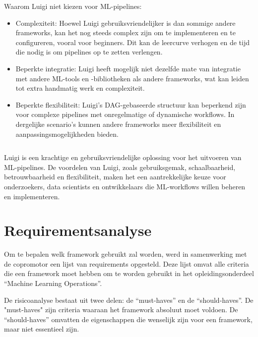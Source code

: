 Waarom Luigi niet kiezen voor ML-pipelines:
\begin{itemize}
    \item Complexiteit: Hoewel Luigi gebruiksvriendelijker is dan sommige andere frameworks, kan het nog steeds complex zijn om te implementeren en te configureren, vooral voor beginners. Dit kan de leercurve verhogen en de tijd die nodig is om pipelines op te zetten verlengen.
    \item Beperkte integratie: Luigi heeft mogelijk niet dezelfde mate van integratie met andere ML-tools en -bibliotheken als andere frameworks, wat kan leiden tot extra handmatig werk en complexiteit.
    \item Beperkte flexibiliteit: Luigi's DAG-gebaseerde structuur kan beperkend zijn voor complexe pipelines met onregelmatige of dynamische workflows. In dergelijke scenario's kunnen andere frameworks meer flexibiliteit en aanpassingsmogelijkheden bieden.
  \end{itemize}
\begin{verbatim}
\end{verbatim}
Luigi is een krachtige en gebruiksvriendelijke oplossing voor het uitvoeren van ML-pipelines. De voordelen van Luigi, zoals gebruiksgemak, schaalbaarheid, betrouwbaarheid en flexibiliteit, maken het een aantrekkelijke keuze voor onderzoekers, data scientists en ontwikkelaars die ML-workflows willen beheren en implementeren.



\section{Requirementsanalyse}

Om te bepalen welk framework gebruikt zal worden, werd in samenwerking met de copromotor een lijst van requirements opgesteld. Deze lijst omvat alle criteria die een framework moet hebben om te worden gebruikt in het opleidingsonderdeel ``Machine Learning Operations''.


De risicoanalyse bestaat uit twee delen: de ``must-haves'' en de ``should-haves''. De "must-haves" zijn criteria waaraan het framework absoluut moet voldoen. De ``should-haves'' omvatten de eigenschappen die wenselijk zijn voor een framework, maar niet essentieel zijn.

